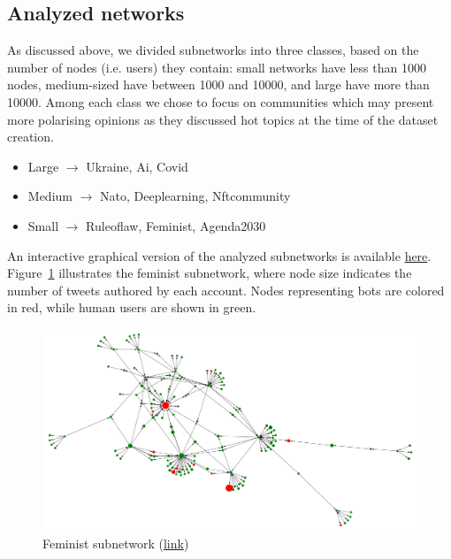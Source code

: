 \documentclass[12pt, a4paper]{article}
\begin{document}
	\subsection{Analyzed networks}
    	As discussed above, we divided subnetworks into three classes, based on the number of nodes (i.e. users) they contain: small networks have less than 1000 nodes, medium-sized have between 1000 and 10000, and large have more than 10000. Among each class we chose to focus on communities which may present more polarising opinions as they discussed hot topics at the time of the dataset creation.
    	\begin{itemize}
			\item Large $\rightarrow$ Ukraine, Ai, Covid
			\item Medium $\rightarrow$ Nato, Deeplearning, Nftcommunity
			\item Small $\rightarrow$ Ruleoflaw, Feminist, Agenda2030
		\end{itemize}
		An interactive graphical version of the analyzed subnetworks is available \href{https://alessiacrimaldi.github.io/sna_project/}{here}. Figure~\ref{fig:feminist_subnetwork} illustrates the feminist subnetwork, where node size indicates the number of tweets authored by each account. Nodes representing bots are colored in red, while human users are shown in green.
		\begin{figure}[H]
    		\centering
    		\includegraphics[width=\textwidth]{feminist_subnetwork.png}
    		\caption{Feminist subnetwork (\href{https://alessiacrimaldi.github.io/sna_project/results/subnetworks/feminist/feminist_network}{link})}
    		\label{fig:feminist_subnetwork}
		\end{figure}
		
\end{document}

